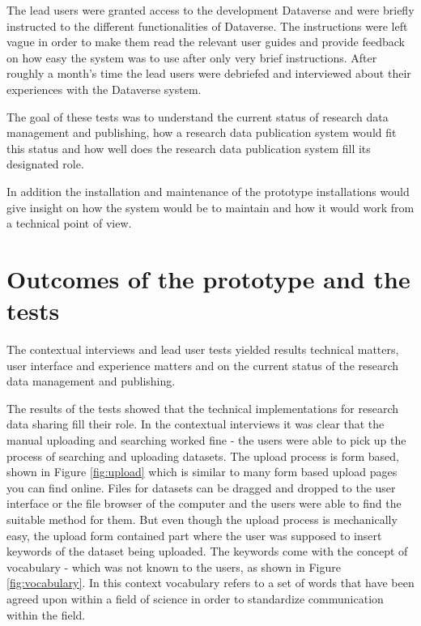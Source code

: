 The lead users were granted access to the development Dataverse and were
briefly instructed to the different functionalities of Dataverse. The
instructions were left vague in order to make them read the relevant user
guides and provide feedback on how easy the system was to use after only very
brief instructions. After roughly a month's time the lead users were debriefed
and interviewed about their experiences with the Dataverse system.

The goal of these tests was to understand the current status of research data
management and publishing, how a research data publication system would fit
this status and how well does the research data publication system fill its
designated role.

In addition the installation and maintenance of the prototype installations
would give insight on how the system would be to maintain and how it would work
from a technical point of view.

\section{Outcomes of the prototype and the tests}
\label{sec:prototype_outcomes}

The contextual interviews and lead user tests yielded results technical matters,
user interface and experience matters and on the current status of the research
data management and publishing.

The results of the tests showed that the technical implementations for research
data sharing fill their role. In the contextual interviews it was clear that
the manual uploading and searching worked fine - the users were able to pick up
the process of searching and uploading datasets. The upload process is form
based, shown in Figure \ref{fig:upload} which is similar to many
form based upload pages you can find online. Files for datasets can be dragged and
dropped to the user interface or the file browser of the computer and the users
were able to find the suitable method for them. But even
though the upload process is mechanically easy, the upload form contained part
where the user was supposed to insert keywords of the dataset being uploaded.
The keywords come with the concept of vocabulary - which was not known to the
users, as shown in Figure \ref{fig:vocabulary}. In this context vocabulary
refers to a set of words that have been agreed upon within a field of science
in order to standardize communication within the field.

